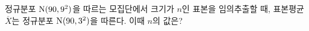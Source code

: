 정규분포 $\mathrm{N}(90{,}\mkern3mu\mathopen{}9^2)$을 따르는 모집단에서 크기가 $n$인 표본을 임의추출할 때, 표본평균 $\overline{X}$는 정규분포 $\mathrm{N}(90{,}\mkern3mu\mathopen{}3^2)$을 따른다. 이때 $n$의 값은?
